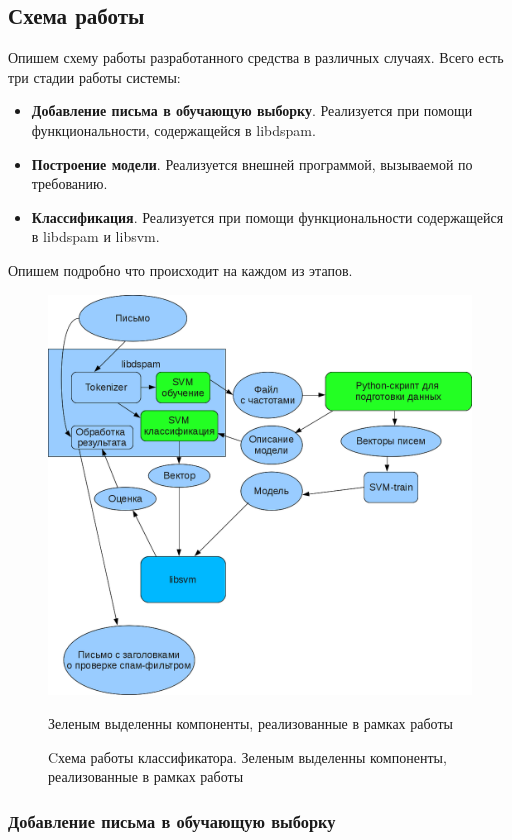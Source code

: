 \subsection{Схема работы}
Опишем схему работы разработанного средства в различных случаях.
Всего есть три стадии работы системы:
\begin{itemize}
\item \textbf{Добавление письма в обучающую выборку}. Реализуется при помощи функциональности, содержащейся в libdspam.
\item \textbf{Построение модели}. Реализуется внешней программой, вызываемой по требованию.
\item \textbf{Классификация}. Реализуется при помощи функциональности содержащейся в libdspam и libsvm.
\end{itemize}

Опишем подробно что происходит на каждом из этапов.

\begin{figure}[h]
\begin{center}
\includegraphics[width=12cm]{img/working_scheme2}
\end{center}
Зеленым выделенны компоненты, реализованные в рамках работы\caption{Cхема работы классификатора. Зеленым выделенны компоненты, реализованные в рамках работы}
\label{dspamarch}
\end{figure}

\subsubsection{Добавление письма в обучающую выборку}

